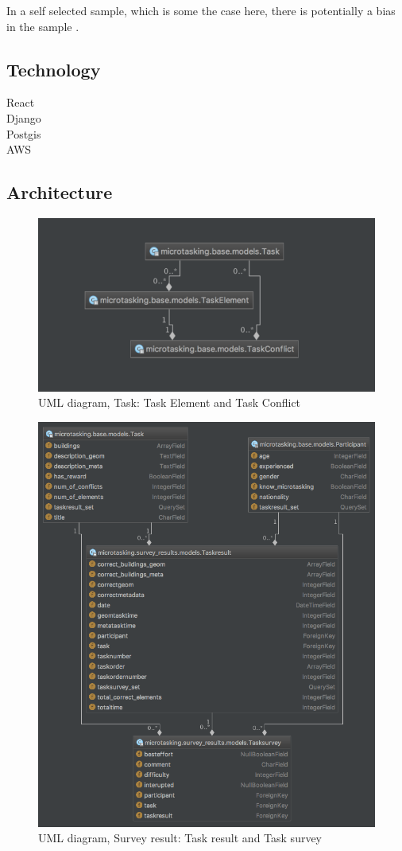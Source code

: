 In a self selected sample, which is some the case here, there is potentially a bias in the sample \citep{Ben2009}. %

\subsection{Technology}
React \\
Django \\
Postgis \\
AWS \\

\subsection{Architecture}

\begin{figure}[H]
	\centering
	\includegraphics[width=0.7\linewidth]{fig/uml_diagram_task2}
	\caption[Task, UML diagram]{UML diagram, Task: Task Element and Task Conflict}
	\label{fig:umldiagramtask2}
\end{figure}


\begin{figure}[H]
	\centering
	\includegraphics[width=0.8\linewidth]{fig/uml_diagram_taskresult}
	\caption[Survey result, UML diagram]{UML diagram, Survey result: Task result and Task survey}
	\label{fig:umldiagramtaskresult}
\end{figure}



